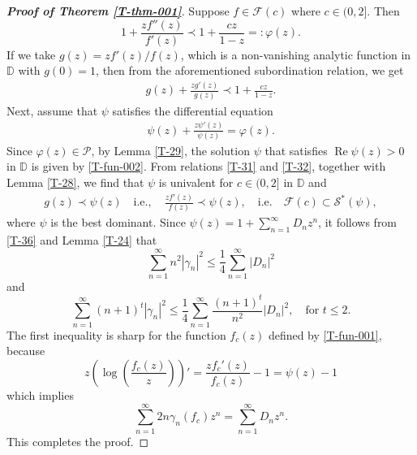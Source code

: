 \documentclass[a4paper,12pt]{amsart}
\theoremstyle{definition}
\begin{document}
\begin{proof}[\textbf{Proof of Theorem \ref{T-thm-001}}]
Suppose $ f \in \mathcal{F}(c) $ where $c\in(0,2]$. Then 
$$
1 + \frac{zf''(z)}{f'(z)} \prec 1 + \frac{cz}{1-z}=:\varphi(z).
$$
If we take $ g(z) = zf'(z)/f(z) $, which is a non-vanishing analytic function in $\mathbb{D}$ with $ g(0) = 1 $, then from the aforementioned subordination relation, we get
\begin{align}\label{T-31}
g(z) + \frac{zg'(z)}{g(z)} \prec 1 + \frac{cz}{1-z}.
\end{align}
Next, assume that $\psi$ satisfies the differential equation
\begin{align}\label{T-32}
\psi(z) + \frac{z\psi'(z)}{\psi(z)} = \varphi(z). 
\end{align}
Since $\varphi(z)\in \mathcal{P}$, by Lemma \ref{T-29}, the solution $\psi$ that satisfies $\operatorname{Re} \psi(z) > 0$ in $\mathbb{D}$ is given by \eqref{T-fun-002}. From relations \eqref{T-31} and \eqref{T-32}, together with Lemma \ref{T-28}, we find that $\psi$ is univalent for $c \in (0, 2]$ in $\mathbb{D}$ and
\begin{align}\label{T-36}
    g(z) \prec \psi(z) \quad \text{i.e.}, \quad \frac{zf'(z)}{f(z)} \prec \psi(z),  \quad \text{i.e.} \quad \mathcal{F}(c) \subset \mathcal{S}^*(\psi), 
\end{align}
where $\psi$ is the best dominant. Since $\psi(z) = 1 + \sum_{n=1}^{\infty} D_n z^n$, it follows from \eqref{T-36} and Lemma \ref{T-24} that
$$
\sum_{n=1}^{\infty} n^2 |\gamma_n|^2 \leq \frac{1}{4} \sum_{n=1}^{\infty} |D_n|^2
$$
and
$$
\sum_{n=1}^{\infty} (n+1)^t |\gamma_n|^2 \leq \frac{1}{4} \sum_{n=1}^{\infty} \frac{(n+1)^t}{n^2} |D_n|^2, \quad \text{for } t \leq 2.
$$
The first inequality is sharp for the function $f_c(z)$ defined by \eqref{T-fun-001}, because
$$
z \left( \log \left( \frac{f_c(z)}{z} \right) \right)'= \frac{z f_c'(z)}{f_c(z)} - 1 = \psi(z)-1
$$
which implies
$$
\sum_{n=1}^{\infty} 2n \gamma_n(f_c) z^n 
= \sum_{n=1}^{\infty} D_n z^n.
$$
This completes the proof.
\end{proof}
\end{document}
